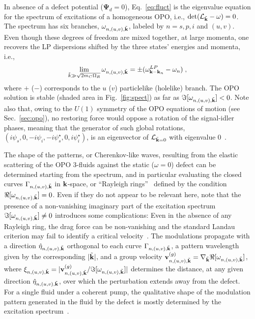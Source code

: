 In absence of a defect potential ($\bm{\Psi}_d =0$),
Eq.~\eqref{eq:fluct} is the eigenvalue equation for the spectrum of
excitations of a homogeneous OPO, i.e.,
$\det(\mathcal{L}_{\tilde{\mathbf{k}}} - \omega)=0$. The spectrum has six
branches, $\omega_{n,(u,v),\tilde{\mathbf{k}}}$, labeled by $n=s,p,i$
and $(u,v)$. Even though these degrees of freedom are mixed together,
at large momenta, one recovers the LP dispersions shifted by the three
states' energies and momenta, i.e.,
%
\begin{equation}
  \lim_{\tilde{k} \gg \sqrt{2m_C \Omega_R}} \omega_{n,(u,v),\tilde{\mathbf{k}}} = \pm
  (\omega^{LP}_{\mathbf{k} - \mathbf{k}_n} - \omega_n)\; ,
\label{eq:large}
\end{equation}
%
where $+$ ($-$) corresponds to the $u$ ($v$) particlelike (holelike)
branch.
%
The OPO solution is stable (shaded area in Fig.~\ref{fig:spect}) as
far as $\Im[\omega_{n,(u,v),\tilde{\mathbf{k}}}] < 0$. Note also that,
owing to the $U(1)$ symmetry of the OPO equations of motion (see
Sec.~\ref{sec:opo}), no restoring force would oppose a rotation of the
signal-idler phases, meaning that the generator of such global
rotations,
$(i\psi_s,0,-i\psi_i,-i\psi_{s}^{\star},0,i\psi_{i}^{\star})$, is an
eigenvector of $\mathcal{L}_{\tilde{\mathbf{k}} = 0}$ with eigenvalue
$0$~\cite{Wouters_2007}.


The shape of the patterns, or Cherenkov-like waves, resulting from the
elastic scattering of the OPO 3-fluids against the static ($\omega=0$)
defect can be determined starting from the spectrum, and in particular
evaluating the closed curves $\Gamma_{n,(u,v), \tilde{\mathbf{k}}}$ in
$\mathbf{k}$-space, or ``Rayleigh rings''~\cite{9783319002651} defined by
the condition $\Re[\omega_{n,(u,v), \tilde{\mathbf{k}}}] = 0$. Even if
they do not appear to be relevant here, note that the presence of a
non-vanishing imaginary part of the excitation spectrum
$\Im[\omega_{n,(u,v),\tilde{\mathbf{k}}}]\neq 0$ introduces some
complications: Even in the absence of any Rayleigh ring, the drag
force can be non-vanishing and the standard Landau criterion may fail
to identify a critical velocity~\cite{Wouters_2010}.
%
The modulations propagate with a direction
$\hat{\eta}_{n,(u,v),\tilde{\mathbf{k}}}$ orthogonal to each curve
$\Gamma_{n,(u,v), \tilde{\mathbf{k}}}$, a pattern wavelength given by
the corresponding $|\tilde{\mathbf{k}}|$, and a group velocity
$\mathbf{v}_{n,(u,v),\tilde{\mathbf{k}}}^{(g)}=\nabla_{\tilde{\mathbf{k}}}
\Re[\omega_{n,(u,v), \tilde{\mathbf{k}}}]$, where
$\xi_{n,(u,v),\tilde{\mathbf{k}}} =
|\mathbf{v}_{n,(u,v),\tilde{\mathbf{k}}}^{(g)} / \Im[\omega_{n,(u,v),
  \tilde{\mathbf{k}}}]|$ determines the distance, at any given direction
$\hat{\eta}_{n,(u,v),\tilde{\mathbf{k}}}$, over which the perturbation
extends away from the defect. For a single fluid under a coherent
pump, the qualitative shape of the modulation pattern generated in the
fluid by the defect is mostly determined by the excitation
spectrum~\cite{Carusotto_2006,Carusotto_2004}.

